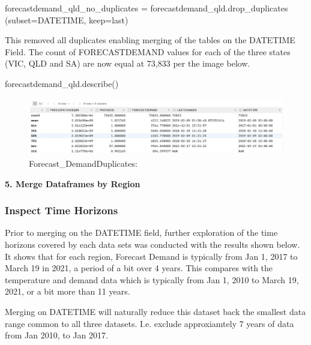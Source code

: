 \documentclass[mstat,12pt]{unswthesis}
\newenvironment{Shaded}{}{}
\newcommand{\NormalTok}[1]{#1}
\newcommand{\OperatorTok}[1]{\textcolor[rgb]{0.40,0.40,0.40}{#1}}
\newcommand{\StringTok}[1]{\textcolor[rgb]{0.25,0.44,0.63}{#1}}
\begin{document}
\begin{Shaded}
\begin{Highlighting}[]
\NormalTok{forecastdemand\_qld\_no\_duplicates }\OperatorTok{=}\NormalTok{ forecastdemand\_qld.drop\_duplicates}
\NormalTok{(subset}\OperatorTok{=}\StringTok{\textquotesingle{}DATETIME\textquotesingle{}}\NormalTok{, keep}\OperatorTok{=}\StringTok{\textquotesingle{}last\textquotesingle{}}\NormalTok{)}
\end{Highlighting}
\end{Shaded}

This removed all duplicates enabling merging of the tables on the
DATETIME Field. The count of FORECASTDEMAND values for each of the three
states (VIC, QLD and SA) are now equal at 73,833 per the image below.

\begin{Shaded}
\begin{Highlighting}[]
\NormalTok{forecastdemand\_qld.describe()}
\end{Highlighting}
\end{Shaded}

\begin{figure}
\centering
\includegraphics{img/QLD_ForecastDemand_DuplicatesRemoved.jpg}
\caption{Forecast\_DemandDuplicates:}
\end{figure}

\textbf{5. Merge Dataframes by Region}

\subsubsection{Inspect Time Horizons}\label{inspect-time-horizons}

Prior to merging on the DATETIME field, further exploration of the time
horizons covered by each data sets was conducted with the results shown
below. It shows that for each region, Forecast Demand is typically from
Jan 1, 2017 to March 19 in 2021, a period of a bit over 4 years. This
compares with the temperature and demand data which is typically from
Jan 1, 2010 to March 19, 2021, or a bit more than 11 years.

Merging on DATETIME will naturally reduce this dataset back the smallest
data range common to all three datasets. I.e. exclude approxiamtely 7
years of data from Jan 2010, to Jan 2017.
\end{document}
